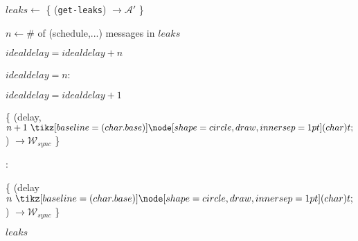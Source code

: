 \begin{bbox}[title={Algorithm $\msf{SimGetLeaks}$}]

$leaks \leftarrow$ \{ \Send (\texttt{get-leaks}) $\rightarrow \mathcal{\mathcal{A}'}$ \}

$n \leftarrow \#$ of (schedule,...) messages in $leaks$

$idealdelay = idealdelay + n$

\If $idealdelay = n$:

	\quad $idealdelay = idealdelay + 1$

	\quad \{ \Send (delay, $n+1 \token$) $\rightarrow \mathcal{W}_{sync}$ \}

\Else:

	\quad \{ \Send (delay $n \token$) $\rightarrow \mathcal{W}_{sync}$ \}

\Return $leaks$

\end{bbox}


